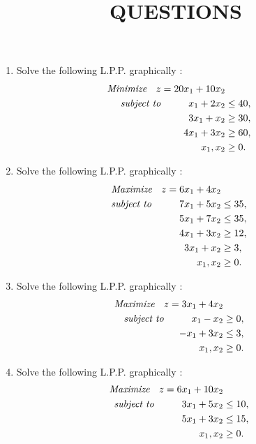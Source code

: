 \documentclass[11pt, a4paper]{article}
\title{\textbf{QUESTIONS}}
\author{}
\date{}
\begin{document}
\maketitle

\begin{enumerate}


\item Solve the following L.P.P. graphically :
	\begin{align*}
\textit{Minimize \hspace{6pt}} z = 20x_1 + 10x_2 \\
\textit{subject to \hspace{25pt}} x_1 + 2x_2 &\leq 40, \\
3x_1 + x_2 &\geq 30, \\
4x_1 + 3x_2 &\geq 60, \\
x_1, x_2 &\geq 0.
	\end{align*}
	


\item Solve the following L.P.P. graphically :
	\begin{align*}
\textit{Maximize \hspace{6pt}} z = 6x_1 + 4x_2 \\
\textit{subject to \hspace{25pt}} 7x_1 + 5x_2 &\leq 35, \\
5x_1 + 7x_2 &\leq 35, \\
4x_1 + 3x_2 &\geq 12, \\
3x_1 + x_2 &\geq 3, \\
x_1, x_2 &\geq 0.
	\end{align*}
	


\item Solve the following L.P.P. graphically :
	\begin{align*}
\textit{Maximize \hspace{6pt}} z = 3x_1 + 4x_2 \\
\textit{subject to \hspace{25pt}} x_1 - x_2 &\geq 0, \\
-x_1 + 3x_2 &\leq 3, \\
x_1, x_2 &\geq 0.
	\end{align*}
	


\item Solve the following L.P.P. graphically :
	\begin{align*}
\textit{Maximize \hspace{6pt}} z = 6x_1 + 10x_2 \\
\textit{subject to \hspace{25pt}} 3x_1 + 5x_2 &\leq 10, \\
5x_1 + 3x_2 &\leq 15, \\
x_1, x_2 &\geq 0.
	\end{align*}
	

\end{enumerate}
\end{document}
